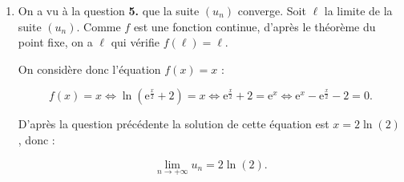 \begin{enumerate}
\begin{enumerate}
Posons $X = \text{e}^{\frac{x}{2}}$. On a alors :

\[\left(\text{e}^{\frac{x}{2}}\right)^{2} - \text{e}^{\frac{x}{2}} - 2 = 0 \iff X^{2} - X - 2 = 0\]

D'après la question précédente, les solutions de l'équation $X^{2} - X - 2 = 0$ sont

$X_{1} = -1$ et $X_{2} = 2$. On a donc :


\[\boxed{\mathcal{S} = \left\{2\ln (2)\strut\right\}}\]

		\item On a vu à la question \textbf{5.} que la suite $\left(u_{n}\right)$ converge. Soit $\ell$ la limite de la suite $\left(u_{n}\right)$. Comme $f$ est une fonction continue, d'après le théorème du point fixe, on a $\ell$ qui vérifie $f(\ell) = \ell$.

On considère donc l'équation $f(x) = x$ :

\[f(x) = x \iff \ln\left(\text{e}^{\frac{x}{2}} + 2\right) = x \iff \text{e}^{\frac{x}{2}} + 2 = \text{e}^{x} \iff \text{e}^{x} - \text{e}^{\frac{x}{2}} - 2 = 0.\]

D'après la question précédente la solution de cette équation est $x = 2\ln(2)$, donc :

\[\boxed{\lim_{n \to +\infty}u_{n} = 2\ln(2)}.\]
	\end{enumerate}
\end{enumerate}


\bigskip

